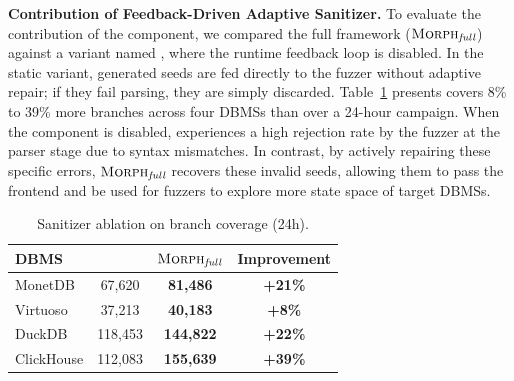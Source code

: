 \documentclass[conference]{IEEEtran}
\begin{document}
\textbf{Contribution of Feedback-Driven Adaptive Sanitizer.}
To evaluate the contribution of the component, we compared the full framework ($\textsc{Morph}{}_{\textit{full}}$) against a variant named \tooldisfuzzer{}, where the runtime feedback loop is disabled. In the static variant, generated seeds are fed directly to the fuzzer without adaptive repair; if they fail parsing, they are simply discarded.
Table~\ref{tab:ablation_sanitizer} presents \tool{} covers 8\% to 39\% more branches across four DBMSs than \tooldisfuzzer{} over a 24-hour campaign. 
When the component is disabled, \tooldisfuzzer{} experiences a high rejection rate by the fuzzer at the parser stage due to syntax mismatches.
In contrast, by actively repairing these specific errors, $\textsc{Morph}{}_{\textit{full}}$ recovers these invalid seeds, allowing them to pass the frontend and be used for fuzzers to explore more state space of target DBMSs. 



\begin{table}[!t]
\centering
\footnotesize
\caption{Sanitizer ablation on branch coverage (24h).}
\label{tab:ablation_sanitizer}
\setlength{\tabcolsep}{3pt}
\begin{tabular*}{\columnwidth}{@{\extracolsep{\fill}}lccc@{}}
\toprule
\textbf{DBMS} & \tooldisfuzzer{} & $\textsc{Morph}{}_{\textit{full}}$ & \textbf{Improvement} \\
\midrule
MonetDB    & 67,620 & \textbf{81,486}  & \textbf{+21\%} \\
Virtuoso   & 37,213 & \textbf{40,183}  & \textbf{+8\%} \\
DuckDB     & 118,453 & \textbf{144,822} & \textbf{+22\%} \\
ClickHouse & 112,083 & \textbf{155,639} & \textbf{+39\%} \\
\bottomrule
\end{tabular*}
\vspace{-0.8em}
\end{table}
\end{document}
